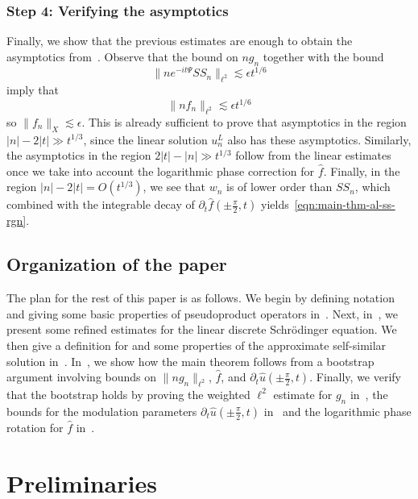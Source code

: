 \documentclass[letterpaper, reqno,final]{amsart}
\newcommand{\fhPi}{\frac{\pi}{2}}
\newcommand{\mSS}{\mathit{SS}}
\newcommand{\discrAvg}{\Psi}
\newcommand{\invLinProp}[1][t]{e^{-i#1\discrAvg}}
\begin{document}
\subsubsection{Step 4: Verifying the asymptotics}

Finally, we show that the previous estimates are enough to obtain the asymptotics from~. Observe that the bound on $ng_n$ together with the bound
\begin{equation*}
    \lVert n \invLinProp \mSS_n \rVert_{\ell^2} \lesssim \epsilon t^{1/6}
\end{equation*}
imply that 
\begin{equation*}
    \lVert nf_n \rVert_{\ell^2} \lesssim \epsilon t^{1/6}
\end{equation*}
so $\lVert f_n \rVert_X \lesssim \epsilon$.  This is already sufficient to prove that asymptotics in the region $|n| - 2|t| \gg t^{1/3}$, since the linear solution $u_n^L$ also has these asymptotics.  Similarly, the asymptotics in the region $2|t| - |n| \gg t^{1/3}$ follow from the linear estimates once we take into account the logarithmic phase correction for $\hat{f}$.  Finally, in the region $|n| - 2|t| = O(t^{1/3})$, we see that $w_n$ is of lower order than $\mSS_n$, which combined with the integrable decay of $\partial_t \hat{f}(\pm\fhPi,t)$ yields~\eqref{eqn:main-thm-al-ss-rgn}.

\subsection{Organization of the paper}

The plan for the rest of this paper is as follows.  We begin by defining notation and giving some basic properties of pseudoproduct operators in~.   Next, in~, we present some refined estimates for the linear discrete Schr\"odinger equation.  We then give a definition for and some properties of the approximate self-similar solution in~. In~, we show how the main theorem follows from a bootstrap argument involving bounds on $\lVert ng_n\rVert_{\ell^2}$, $\hat{f}$, and $\partial_t \hat{u}(\pm \fhPi,t)$.  Finally, we verify that the bootstrap holds by proving the weighted $\ell^2$ estimate for $g_n$ in~, the bounds for the modulation parameters $\partial_t \hat{u}(\pm \fhPi,t)$ in~ and the logarithmic phase rotation for $\hat{f}$ in~.

\section{Preliminaries\label{sec:notation-sec}}
\end{document}
